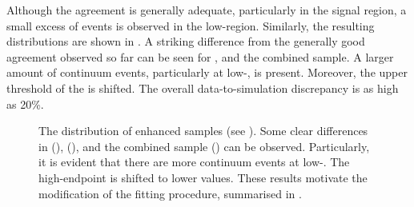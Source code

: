 Although the agreement is generally adequate, particularly in the signal region, a small excess of events is observed in the low-\EB region.
Similarly, the resulting \Mbc distributions are shown in .
A striking difference from the generally good agreement observed so far can be seen for \feiBp, \feiBz and the combined sample.
A larger amount of continuum events, particularly at low-\Mbc, is present.
Moreover, the upper threshold of the \Mbc is shifted.
The overall data-to-simulation discrepancy is as high as 20\%.
\begin{figure}[htbp!]
    \centering
    \caption{\label{fig:qqbar_enhanced_mbc}
    The \Mbc distribution of \qqbar enhanced samples (see ).
    Some clear differences in \feiBp (), \feiBz (),
    and the combined sample () can be observed.
    Particularly, it is evident that there are more continuum events at low-\Mbc.
    The \Mbc high-endpoint is shifted to lower values.
    These results motivate the modification of the \Mbc fitting procedure, 
    summarised in .
    }
\end{figure}

